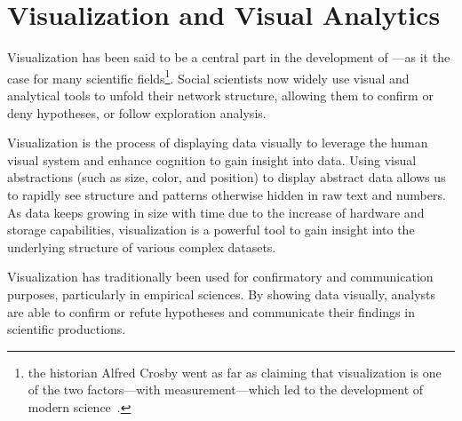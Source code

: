\section{Visualization and Visual Analytics}

Visualization has been said to be a central part in the development of \sna\cite{freemanVisualizingSocialNetworks2000, wolfeRiseNetworkThinking1978}---as it the case for many scientific fields\footnote{the historian Alfred Crosby went as far as claiming that visualization is one of the two factors---with measurement---which led to the development of modern science~\cite{crosbyMeasureReality1998}.}.
Social scientists now widely use visual and analytical tools to unfold their network structure, allowing them to confirm or deny hypotheses, or follow exploration analysis.

Visualization is the process of displaying data visually to leverage the human visual system and enhance cognition to gain insight into data\cite{cardReadingsInformationVisualization1999}.
Using visual abstractions (such as size, color, and position) to display abstract data allows us to rapidly see structure and patterns otherwise hidden in raw text and numbers.
As data keeps growing in size with time due to the increase of hardware and storage capabilities, visualization is a powerful tool to gain insight into the underlying structure of various complex datasets.

Visualization has traditionally been used for confirmatory and communication purposes, particularly in empirical sciences\cite{shneidermanInventingDiscoveryTools2002}.
By showing data visually, analysts are able to confirm or refute hypotheses and communicate their findings in scientific productions.


